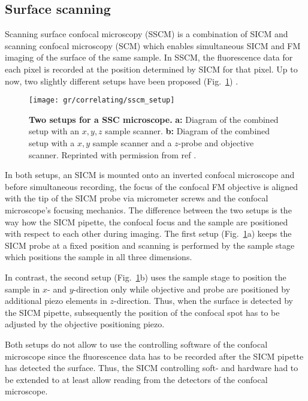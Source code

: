 \subsection{Surface scanning}

Scanning surface confocal microscopy (SSCM) \cite{Gorelik2002} is a
combination of SICM and scanning confocal microscopy (SCM) which enables
simultaneous SICM and FM imaging of the surface of the same sample. In SSCM,
the fluorescence data for each pixel is recorded at the position determined by
SICM for that pixel. Up to now, two slightly different setups have been proposed
(Fig.~\ref{fig:sscm_setup}) \cite{Gorelik2002,Shevchuk2013}.

\begin{figure}
  \texttt{[image: gr/correlating/sscm\_setup]}

  \caption{%
    \textbf{Two setups for a SSC microscope.}
    \textbf{a:} Diagram of the combined setup with an $x,y,z$ sample scanner.
    \textbf{b:} Diagram of the combined setup with a $x,y$ sample scanner and
    a $z$-probe and objective scanner. 
    Reprinted with permission from ref \cite{Shevchuk2013}.
  }
  \label{fig:sscm_setup}
\end{figure}

In both setups, an SICM is mounted onto an inverted confocal microscope and
before simultaneous recording, the focus of the confocal FM objective is
aligned with the tip of the SICM probe via micrometer screws and the confocal
microscope's focusing mechanics. The
difference between the two setups is the way how the SICM pipette, the
confocal focus and the sample are positioned with respect to each other during
imaging. The
first setup (Fig.~\ref{fig:sscm_setup}a) keeps the 
SICM probe at a fixed position and scanning is performed by the sample
stage which positions the sample in all three dimensions.

In contrast, the second setup (Fig.~\ref{fig:sscm_setup}b) uses the sample
stage to position the sample in $x$- and $y$-direction only while objective
and probe are positioned by additional piezo elements in $z$-direction. Thus,
when the surface is detected by the SICM pipette, subsequently the position of
the confocal spot has to be adjusted by the objective positioning piezo.

Both setups do not allow to use the controlling software of the confocal
microscope since the fluorescence data has to be recorded after the SICM
pipette has detected the surface. Thus, the SICM controlling soft- and
hardware had to be extended to at least allow reading from the detectors of
the confocal microscope. 

